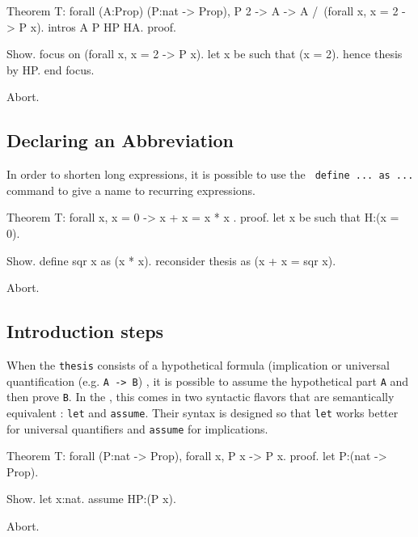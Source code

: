 \begin{coq_eval}
Theorem T: forall (A:Prop) (P:nat -> Prop), P 2 -> A -> A /\ (forall x, x = 2 -> P x).
intros A P HP HA.
proof.
\end{coq_eval} 
\begin{coq_example}
Show.
focus on (forall x, x = 2 -> P x).
let x be such that (x = 2).
hence thesis by HP.
end focus.
\end{coq_example}
\begin{coq_eval}
Abort.
\end{coq_eval}

\subsection{Declaring an Abbreviation}

In order to shorten long expressions, it is possible to use the {\tt
  define ... as ...} command to give a name to recurring expressions.

\begin{coq_eval}
Theorem T: forall x, x = 0 -> x + x = x * x .
proof.
let x be such that H:(x = 0).
\end{coq_eval} 
\begin{coq_example}
Show.
define sqr x as (x * x).
reconsider thesis as (x + x = sqr x).
\end{coq_example}
\begin{coq_eval}
Abort.
\end{coq_eval}

\subsection{Introduction steps}

When the {\tt thesis} consists of a hypothetical formula (implication
or universal quantification (e.g. \verb+A -> B+) , it is possible to
assume the hypothetical part {\tt A} and then prove {\tt B}. In the
\DPL{}, this comes in two syntactic flavors that are semantically
equivalent : {\tt let} and {\tt assume}. Their syntax is designed so that {\tt let} works better for universal quantifiers and {\tt assume} for implications.

\begin{coq_eval}
Theorem T: forall (P:nat -> Prop), forall x, P x -> P x.
proof.
let P:(nat -> Prop).
\end{coq_eval} 
\begin{coq_example}
Show.
let x:nat.
assume HP:(P x).
\end{coq_example}
\begin{coq_eval}
Abort.
\end{coq_eval}

